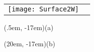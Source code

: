 \documentclass[varwidth=36em]{standalone}
\begin{document}
	\begin{tabular}[c]{p{20em}p{55em}}
		\shortstack[c]{
			\texttt{[image: Surface2W]}\\[0.0cm]}%
		& 
		\shortstack[c]{
			\texttt{[image: excitedStates]}}%
	\end{tabular}
	\begin{textblock*}{5em}(.5em, -17em)\sf (a)\end{textblock*}
	\begin{textblock*}{5em}(20em, -17em)\sf (b)\end{textblock*}
\end{document}
